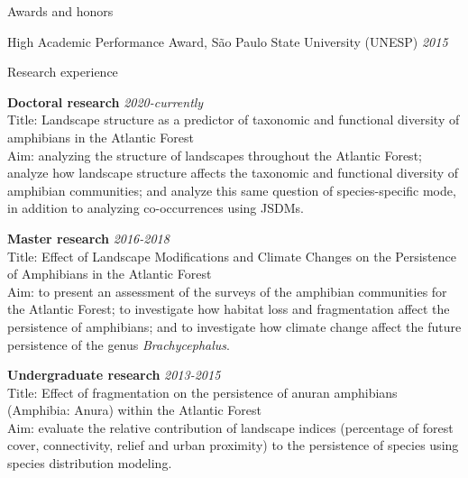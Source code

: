 \documentclass{resume}
\begin{document}

\begin{rSection}{Awards and honors} 

{High Academic Performance Award, São Paulo State University (UNESP)} \hfill{\em 2015}

\end{rSection}


\begin{rSection}{Research experience}

{\bf Doctoral research} \hfill{\em 2020-currently} \\ 
Title: Landscape structure as a predictor of taxonomic and functional diversity of amphibians in the Atlantic Forest \\ 
Aim: analyzing the structure of landscapes throughout the Atlantic Forest; analyze how landscape structure affects the taxonomic and functional diversity of amphibian communities; and analyze this same question of species-specific mode, in addition to analyzing co-occurrences using JSDMs.

{\bf Master research} \hfill{\em 2016-2018} \\ 
Title: Effect of Landscape Modifications and Climate Changes on the Persistence of Amphibians in the Atlantic Forest \\ 
Aim: to present an assessment of the surveys of the amphibian communities for the Atlantic Forest; to investigate how habitat loss and fragmentation affect the persistence of amphibians; and to investigate how climate change affect the future persistence of the genus {\it Brachycephalus}.

{\bf Undergraduate research} \hfill{\em 2013-2015} \\ 
Title: Effect of fragmentation on the persistence of anuran amphibians (Amphibia: Anura) within the Atlantic Forest \\ 
Aim: evaluate the relative contribution of landscape indices (percentage of forest cover, connectivity, relief and urban proximity) to the persistence of species using species distribution modeling.

\end{rSection}
\end{document}
